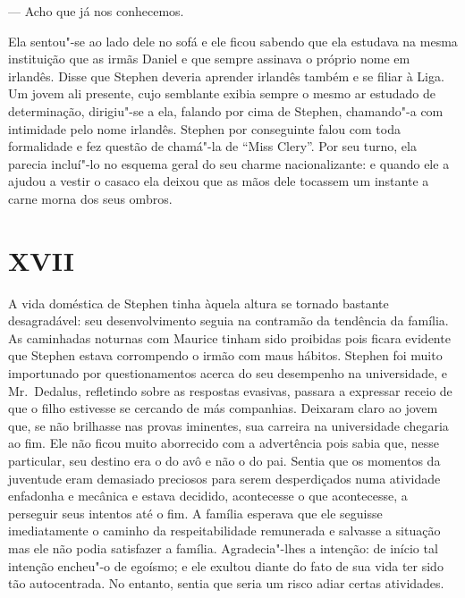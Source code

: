 --- Acho que já nos conhecemos.

Ela sentou"-se ao lado dele no sofá e ele ficou sabendo que ela estudava
na mesma instituição que as irmãs Daniel e que sempre assinava o
próprio nome em irlandês.  Disse que Stephen deveria \label{aprender"-irlandes} aprender irlandês
também e se filiar à Liga.  Um jovem ali presente, cujo
semblante exibia sempre o mesmo ar estudado de determinação, dirigiu"-se
a ela, falando por cima de Stephen, chamando"-a com intimidade pelo nome
irlandês.  Stephen por conseguinte falou com toda formalidade e fez
questão de chamá"-la de “Miss Clery”.  Por seu turno, ela parecia
incluí"-lo no \label{esquema"-geral} esquema geral do seu charme nacionalizante: e quando ele
a ajudou a vestir o casaco ela deixou que as mãos dele tocassem um
instante a carne morna dos seus ombros.


\section{XVII}

A vida doméstica de Stephen tinha àquela altura se tornado bastante
desagradável: seu desenvolvimento seguia na contramão da
tendência da família.  As caminhadas noturnas com Maurice tinham sido
proibidas pois ficara evidente que Stephen estava corrompendo o irmão
com maus hábitos.  Stephen foi muito importunado por questionamentos
acerca do seu desempenho na universidade, e Mr.~Dedalus, refletindo
sobre as respostas evasivas, passara a expressar receio de que o filho
estivesse se cercando de más companhias.  Deixaram claro ao jovem
que, se não brilhasse nas provas iminentes, sua carreira na
universidade chegaria ao fim.  Ele não ficou muito aborrecido com a
advertência pois sabia que, nesse particular, seu destino era o do avô
e não o do pai.  Sentia que os momentos da juventude eram demasiado
preciosos para serem desperdiçados numa atividade enfadonha e mecânica
e estava decidido, acontecesse o que acontecesse, a perseguir seus
intentos até o fim.  A família esperava que ele seguisse imediatamente
o caminho da respeitabilidade remunerada e salvasse a situação mas ele
não podia satisfazer a família.  Agradecia"-lhes a intenção: de início
tal intenção encheu"-o de egoísmo; e ele exultou diante do fato de sua
vida ter sido tão autocentrada.  No entanto, sentia que \label{seria"-um} seria
um risco adiar certas atividades.

